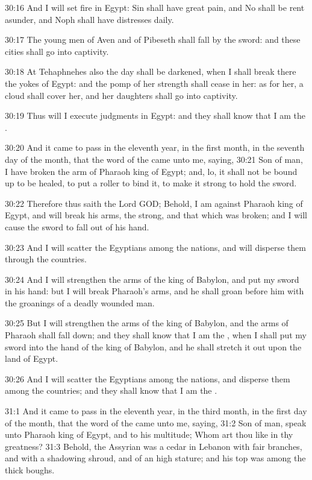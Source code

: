 30:16 And I will set fire in Egypt: Sin shall have great pain, and No shall be rent asunder, and Noph shall have distresses daily.

30:17 The young men of Aven and of Pibeseth shall fall by the sword: and these cities shall go into captivity.

30:18 At Tehaphnehes also the day shall be darkened, when I shall break there the yokes of Egypt: and the pomp of her strength shall cease in her: as for her, a cloud shall cover her, and her daughters shall go into captivity.

30:19 Thus will I execute judgments in Egypt: and they shall know that I am the \LORD.

30:20 And it came to pass in the eleventh year, in the first month, in the seventh day of the month, that the word of the \LORD came unto me, saying, 30:21 Son of man, I have broken the arm of Pharaoh king of Egypt; and, lo, it shall not be bound up to be healed, to put a roller to bind it, to make it strong to hold the sword.

30:22 Therefore thus saith the Lord GOD; Behold, I am against Pharaoh king of Egypt, and will break his arms, the strong, and that which was broken; and I will cause the sword to fall out of his hand.

30:23 And I will scatter the Egyptians among the nations, and will disperse them through the countries.

30:24 And I will strengthen the arms of the king of Babylon, and put my sword in his hand: but I will break Pharaoh's arms, and he shall groan before him with the groanings of a deadly wounded man.

30:25 But I will strengthen the arms of the king of Babylon, and the arms of Pharaoh shall fall down; and they shall know that I am the \LORD, when I shall put my sword into the hand of the king of Babylon, and he shall stretch it out upon the land of Egypt.

30:26 And I will scatter the Egyptians among the nations, and disperse them among the countries; and they shall know that I am the \LORD.

31:1 And it came to pass in the eleventh year, in the third month, in the first day of the month, that the word of the \LORD came unto me, saying, 31:2 Son of man, speak unto Pharaoh king of Egypt, and to his multitude; Whom art thou like in thy greatness?  31:3 Behold, the Assyrian was a cedar in Lebanon with fair branches, and with a shadowing shroud, and of an high stature; and his top was among the thick boughs.

